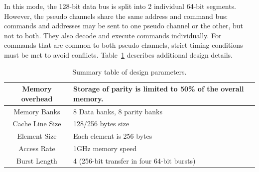 In this mode, the 128-bit data bus is split into 2 individual 64-bit segments. 
However, the pseudo channels share the same address and command bus: commands and addresses may be sent to one pseudo channel or the other, but not to both. They also decode and execute commands individually. For commands that are common to both pseudo channels, strict timing conditions must be met to avoid conflicts.
Table~\ref{tab:design_params} describes additional design details.
%
\begin{table}[h!]
 \small
  \centering
  \begin{tabular}{|c|p{5cm}|}
    \hline
    Memory overhead & Storage of parity is limited to 50\% of the overall memory. \\
    \hline
    Memory Banks & 8 Data banks, 8 parity banks \\
    \hline           
    Cache Line Size & 128/256 bytes size \\ \hline  
    Element Size & Each element is 256 bytes \\ \hline  
    Access Rate & 1GHz memory speed \\ \hline  
    Burst Length & 4 (256-bit transfer in four 64-bit bursts)\\ \hline
  \end{tabular}
  \caption{Summary table of design parameters.}
  \label{tab:design_params}
\end{table}


